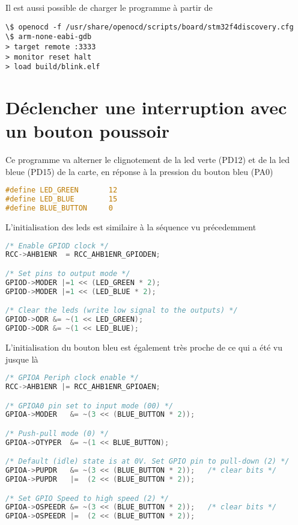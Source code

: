 \documentclass{FicheLecture}
\begin{document}
Il est aussi possible de charger le programme à partir de 

\begin{lstlisting}
\$ openocd -f /usr/share/openocd/scripts/board/stm32f4discovery.cfg
\$ arm-none-eabi-gdb
> target remote :3333
> monitor reset halt
> load build/blink.elf
\end{lstlisting}

\section{Déclencher une interruption avec un bouton poussoir}

Ce programme va alterner le clignotement de la led verte (PD12) et de la led bleue (PD15) de la carte, en réponse à la pression du bouton bleu (PA0)

\begin{lstlisting}[language=C]
#define LED_GREEN       12
#define LED_BLUE        15
#define BLUE_BUTTON     0
\end{lstlisting}

L'initialisation des leds est similaire à la séquence vu précedemment 

\begin{lstlisting}[language=C]
/* Enable GPIOD clock */
RCC->AHB1ENR  = RCC_AHB1ENR_GPIODEN;

/* Set pins to output mode */
GPIOD->MODER |=1 << (LED_GREEN * 2);
GPIOD->MODER |=1 << (LED_BLUE * 2);

/* Clear the leds (write low signal to the outputs) */
GPIOD->ODR &= ~(1 << LED_GREEN);
GPIOD->ODR &= ~(1 << LED_BLUE);
\end{lstlisting}

L'initialisation du bouton bleu est également très proche de ce qui a été vu jusque là

\begin{lstlisting}[language=C]
/* GPIOA Periph clock enable */
RCC->AHB1ENR |= RCC_AHB1ENR_GPIOAEN;

/* GPIOA0 pin set to input mode (00) */
GPIOA->MODER   &= ~(3 << (BLUE_BUTTON * 2));

/* Push-pull mode (0) */
GPIOA->OTYPER  &= ~(1 << BLUE_BUTTON);

/* Default (idle) state is at 0V. Set GPIO pin to pull-down (2) */
GPIOA->PUPDR   &= ~(3 << (BLUE_BUTTON * 2));   /* clear bits */
GPIOA->PUPDR   |=  (2 << (BLUE_BUTTON * 2));

/* Set GPIO Speed to high speed (2) */
GPIOA->OSPEEDR &= ~(3 << (BLUE_BUTTON * 2));   /* clear bits */
GPIOA->OSPEEDR |=  (2 << (BLUE_BUTTON * 2));
\end{lstlisting}
\end{document}

